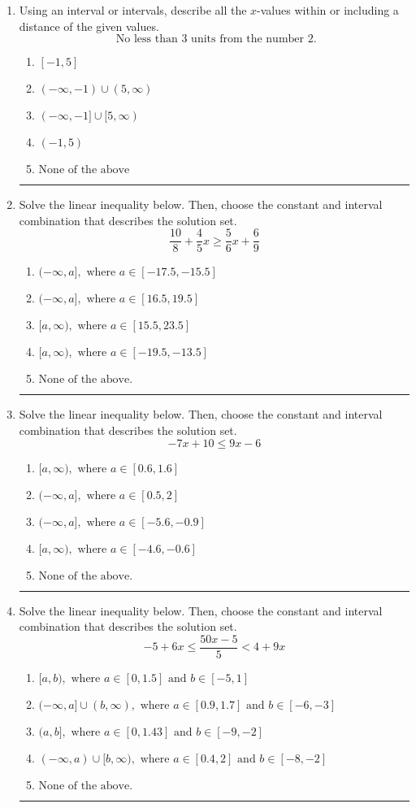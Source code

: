 \documentclass[14pt]{extbook}
\newcommand{\litem}[1]{\item#1\hspace*{-1cm}\rule{\textwidth}{0.4pt}}
\begin{document}
\begin{enumerate}
{\begin{enumerate}[label=\Alph*.]
\end{enumerate} }
\litem{
Using an interval or intervals, describe all the $x$-values within or including a distance of the given values.\[ \text{ No less than } 3 \text{ units from the number } 2. \]\begin{enumerate}[label=\Alph*.]
\item \( [-1, 5] \)
\item \( (-\infty, -1) \cup (5, \infty) \)
\item \( (-\infty, -1] \cup [5, \infty) \)
\item \( (-1, 5) \)
\item \( \text{None of the above} \)

\end{enumerate} }
\litem{
Solve the linear inequality below. Then, choose the constant and interval combination that describes the solution set.\[ \frac{10}{8} + \frac{4}{5} x \geq \frac{5}{6} x + \frac{6}{9} \]\begin{enumerate}[label=\Alph*.]
\item \( (-\infty, a], \text{ where } a \in [-17.5, -15.5] \)
\item \( (-\infty, a], \text{ where } a \in [16.5, 19.5] \)
\item \( [a, \infty), \text{ where } a \in [15.5, 23.5] \)
\item \( [a, \infty), \text{ where } a \in [-19.5, -13.5] \)
\item \( \text{None of the above}. \)

\end{enumerate} }
\litem{
Solve the linear inequality below. Then, choose the constant and interval combination that describes the solution set.\[ -7x + 10 \leq 9x -6 \]\begin{enumerate}[label=\Alph*.]
\item \( [a, \infty), \text{ where } a \in [0.6, 1.6] \)
\item \( (-\infty, a], \text{ where } a \in [0.5, 2] \)
\item \( (-\infty, a], \text{ where } a \in [-5.6, -0.9] \)
\item \( [a, \infty), \text{ where } a \in [-4.6, -0.6] \)
\item \( \text{None of the above}. \)

\end{enumerate} }
\litem{
Solve the linear inequality below. Then, choose the constant and interval combination that describes the solution set.\[ -5 + 6 x \leq \frac{50 x - 5}{5} < 4 + 9 x \]\begin{enumerate}[label=\Alph*.]
\item \( [a, b), \text{ where } a \in [0, 1.5] \text{ and } b \in [-5, 1] \)
\item \( (-\infty, a] \cup (b, \infty), \text{ where } a \in [0.9, 1.7] \text{ and } b \in [-6, -3] \)
\item \( (a, b], \text{ where } a \in [0, 1.43] \text{ and } b \in [-9, -2] \)
\item \( (-\infty, a) \cup [b, \infty), \text{ where } a \in [0.4, 2] \text{ and } b \in [-8, -2] \)
\item \( \text{None of the above.} \)


\end{enumerate}}
\end{enumerate}
\end{document}
